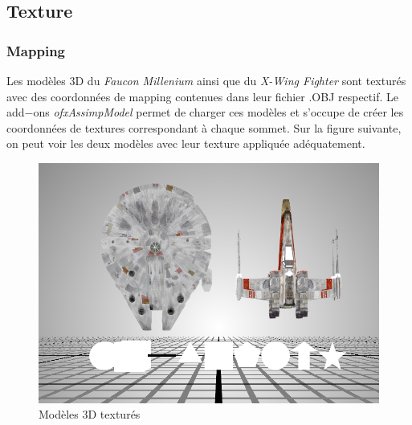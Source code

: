\subsection{Texture}
\subsubsection{Mapping}
Les modèles 3D du \textit{Faucon Millenium} ainsi que du \textit{X-Wing Fighter} sont texturés avec des coordonnées de mapping contenues dans leur fichier .OBJ respectif.
Le add$-$ons \textit{ofxAssimpModel} permet de charger ces modèles et s'occupe de créer les coordonnées de textures correspondant à chaque sommet.
Sur la figure suivante, on peut voir les deux modèles avec leur texture appliquée adéquatement.
\begin{figure}[H]
    \centering
	\includegraphics[scale=0.4]{fig/shapes.PNG}
	\caption{Modèles 3D texturés}
	\label{fig:mapping}
\end{figure}

